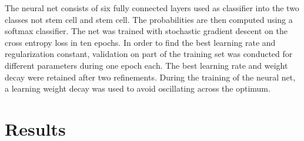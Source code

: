 \documentclass[10pt,conference,compsocconf]{IEEEtran}
\begin{document}
\par
The neural net consists of six fully connected layers used as classifier into the two classes not stem cell and stem cell. The probabilities are then computed using a softmax classifier. The net was trained with stochastic gradient descent on the cross entropy loss in ten epochs. In order to find the best learning rate and regularization constant, validation on part of the training set was conducted for different parameters during one epoch each. The best learning rate and weight decay were retained after two refinements. During the training of the neural net, a learning weight decay was used to avoid oscillating across the optimum.


\section*{Results}
\end{document}
